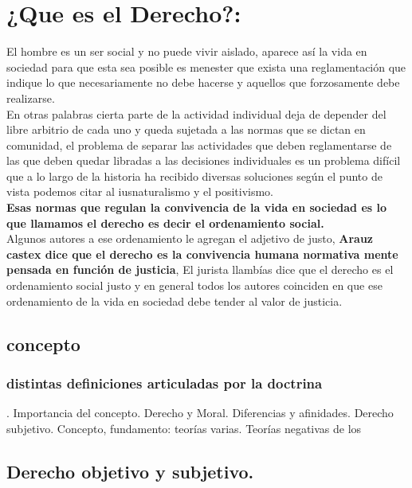 \documentclass[12pt]{book}
\begin{document}
\section{¿Que es el Derecho?:}
El hombre es un ser social y no puede vivir aislado, aparece así la vida en sociedad para que esta sea posible es menester que exista una reglamentación que indique lo que necesariamente no debe hacerse y aquellos que forzosamente debe realizarse.
\\
En otras palabras cierta parte de la actividad individual deja de depender del libre arbitrio de cada uno y queda sujetada a las normas que se dictan en comunidad, el problema de separar las actividades que deben reglamentarse de las que deben quedar libradas a las decisiones individuales es un problema difícil que a lo largo de la historia ha recibido diversas soluciones seg\'un el punto de vista podemos citar al iusnaturalismo y el positivismo.
\\
\textbf{Esas normas que regulan la convivencia de la vida en sociedad es lo que llamamos el derecho es decir el ordenamiento social.}   \\
Algunos autores a ese ordenamiento le agregan el adjetivo de justo, \textbf{Arauz castex dice que el derecho es la convivencia humana normativa mente pensada en función de justicia}, El jurista llambías dice que el derecho es el ordenamiento social justo y en general todos los autores coinciden en que ese ordenamiento de la vida en sociedad debe tender al valor de justicia.

\subsection{concepto}
\subsubsection{ distintas definiciones articuladas por la doctrina}

. Importancia del concepto. 
Derecho y Moral. Diferencias y afinidades.
Derecho subjetivo. Concepto, fundamento: teorías varias. Teorías negativas de los

\subsection{Derecho objetivo y subjetivo.}
\end{document}
